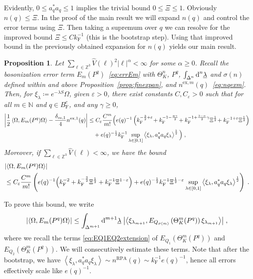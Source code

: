 \documentclass[12pt,a4paper]{article}
\numberwithin{equation}{section}
\newcommand{\NNN}{\mathbb{N}}
\newcommand{\ulambda}{\underline{\lambda}}
\newcommand{\1}{\mathbb{I}}
\newcommand{\di}{\textnormal{d}}
\newcommand{\ex}{\mathrm{ex}}
\newcommand{\F}{\mathrm{F}}
\newcommand{\RPA}{\mathrm{RPA}}
\newcommand{\kF}{k_\F}
\newcommand{\Zstar}{\mathbb{Z}^3} %
\newcommand{\Z}{\mathbb{Z}}
\newcommand{\half}{\frac{1}{2}}
\newcommand{\eva}[1]{\left\langle #1 \right\rangle}
\theoremstyle{plain}
\newtheorem{proposition}[theorem]{Proposition}
\theoremstyle{definition}
\theoremstyle{remark}
\theoremstyle{plain}
\theoremstyle{definition}
\theoremstyle{remark}
\begin{document}
Evidently, $ 0 \le a_q^* a_q \le 1 $ implies the trivial bound $ 0 \le \Xi \le 1 $. Obviously $n(q) \leq \Xi$. In the proof of the main result we will expand $n(q)$ and control the error terms using $\Xi$. Then taking a supremum over $q$ we can resolve for the improved bound $\Xi \leq C \kF^{-1}$ (this is the bootstrap step). Using that improved bound in the previously obtained expansion for $n(q)$ yields our main result.


\begin{proposition} \label{prop:finalEmest}
Let $ \sum_{\ell \in \Zstar} \hat{V}(\ell)^2 |\ell|^\alpha < \infty $ for some $ \alpha \ge 0 $. Recall the bosonization error term $E_m(P^q)$~\eqref{eq:errEm} with $ \Theta^n_K $, $ P^q $, $ \int_{\Delta^n} \di^n \ulambda $ and $ \sigma(n) $ defined within and above Proposition~\ref{prop:finexpan}, and $ n^{\ex,m}(q) $~\eqref{eq:nqexm}. Then, for $ \xi_\lambda \coloneq e^{- \lambda S} \Omega $, given $ \varepsilon > 0 $, there exist constants $ C, C_\varepsilon > 0 $ such that for all $ m \in \NNN $ and $ q \in B_{\F}^c $, and any $ \gamma \ge 0 $,
\begin{align} \label{eq:finalEmest_Coulomb}
	\abs{\half \eva{\Omega, E_m(P^q) \Omega} - \frac{\delta_{m,1}}{4} n^{\ex,1}(q)}
	&\leq C_\varepsilon \frac{C^m}{m!}
		\Big( e(q)^{-1}\left( k_{\F}^{-\frac 32 + \varepsilon} 
		\!+ k_{\F}^{-1 - \frac{\alpha \gamma}{2}} 
		\!+ k_{\F}^{-1 + \frac{3-\alpha}{2} \gamma} \Xi^\half
		\!+ k_{\F}^{-1+\varepsilon} \Xi^\half \right) \nonumber\\
	&\quad + e(q)^{-\half} k_{\F}^{-1} \sup_{\lambda \in [0,1]} \eva{\xi_\lambda, a_q^* a_q \xi_\lambda}^{\half} \Big) \;,
\end{align}
Moreover, if $ \sum_{\ell \in \Zstar} \hat{V}(\ell) < \infty $, we have the bound
\begin{align} \label{eq:finalEmest}
	&\abs{\eva{\Omega, E_m(P^q) \Omega}} \nonumber\\
	&\leq C_\varepsilon \frac{C^m}{m!}
		\left( e(q)^{-1}
		\Big( k_{\F}^{-2}
		+ k_{\F}^{-\frac{3}{2}} \Xi^\half
		+ k_{\F}^{-1} \Xi^{1-\varepsilon} \Big)
		+ e(q)^{-\half} k_{\F}^{-1} \Xi^{\half - \varepsilon} 
		\sup_{\lambda \in [0,1]} \eva{\xi_\lambda, a_q^* a_q \xi_\lambda}^{\half}  \right)\;.
\end{align}
\end{proposition}

To prove this bound, we write
\begin{equation} \label{eq:errEm2}
	\abs{\eva{\Omega, E_m(P^q) \Omega }}
	\le \int_{\Delta^{m+1}} \di^{m+1} \underline{\lambda} \;
		\abs{\eva{\xi_{\lambda_{m+1}}, E_{Q_{\sigma(m)}}\left(\Theta^{m}_{K}(P^q)\right) \xi_{\lambda_{m+1}}}} \;,
\end{equation}
where we recall the terms \eqref{eq:EQ1EQ2extension} of $ E_{Q_1}(\Theta^m_{K}(P^q)) $ and $ E_{Q_2}(\Theta^m_{K}(P^q)) $. We will consecutively estimate these terms.
Note that after the bootstrap, we have $ \eva{\xi_\lambda, a_q^* a_q \xi_\lambda} \sim n^{\RPA}(q) \sim k_{\F}^{-1} e(q)^{-1} $, hence all errors effectively scale like $ e(q)^{-1} $.
\end{document}
